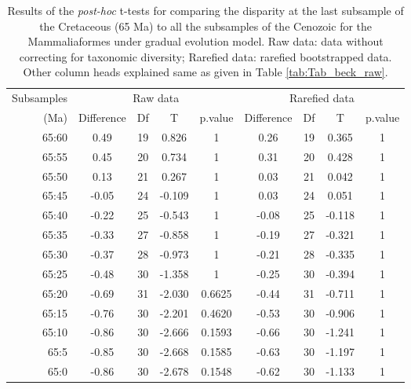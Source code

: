 \documentclass[12pt,letterpaper]{article}
\begin{document}
\begin{table}[!ht]
\caption{Results of the \textit{post-hoc} t-tests for comparing the disparity at the last subsample of the Cretaceous (65 Ma) to all the subsamples of the Cenozoic for the Mammaliaformes \citep[data from][]{Slater2012MEE} under gradual evolution model. Raw data: data without correcting for taxonomic diversity; Rarefied data: rarefied bootstrapped data. Other column heads explained same as given in Table \ref{tab:Tab_beck_raw}.}
\label{tab:Tab_slater}
\centering
\begin{tabular}{r|cccc|cccc}
  \hline
  Subsamples & \multicolumn{4}{c|}{Raw data} & \multicolumn{4}{c}{Rarefied data} \\
  (Ma) & Difference & Df & T & p.value & Difference & Df & T & p.value \\ 
  \hline
  65:60 & 0.49  & 19 & 0.826  & 1      & 0.26  & 19 & 0.365  & 1 \\ 
  65:55 & 0.45  & 20 & 0.734  & 1      & 0.31  & 20 & 0.428  & 1 \\ 
  65:50 & 0.13  & 21 & 0.267  & 1      & 0.03  & 21 & 0.042  & 1 \\ 
  65:45 & -0.05 & 24 & -0.109 & 1      & 0.03  & 24 & 0.051  & 1 \\ 
  65:40 & -0.22 & 25 & -0.543 & 1      & -0.08 & 25 & -0.118 & 1 \\ 
  65:35 & -0.33 & 27 & -0.858 & 1      & -0.19 & 27 & -0.321 & 1 \\ 
  65:30 & -0.37 & 28 & -0.973 & 1      & -0.21 & 28 & -0.335 & 1 \\ 
  65:25 & -0.48 & 30 & -1.358 & 1      & -0.25 & 30 & -0.394 & 1 \\ 
  65:20 & -0.69 & 31 & -2.030 & 0.6625 & -0.44 & 31 & -0.711 & 1 \\ 
  65:15 & -0.76 & 30 & -2.201 & 0.4620 & -0.53 & 30 & -0.906 & 1 \\ 
  65:10 & -0.86 & 30 & -2.666 & 0.1593 & -0.66 & 30 & -1.241 & 1 \\ 
  65:5  & -0.85 & 30 & -2.668 & 0.1585 & -0.63 & 30 & -1.197 & 1 \\ 
  65:0  & -0.86 & 30 & -2.678 & 0.1548 & -0.62 & 30 & -1.133 & 1 \\ 
   \hline
\end{tabular}
\end{table}

%
%
\end{document}
